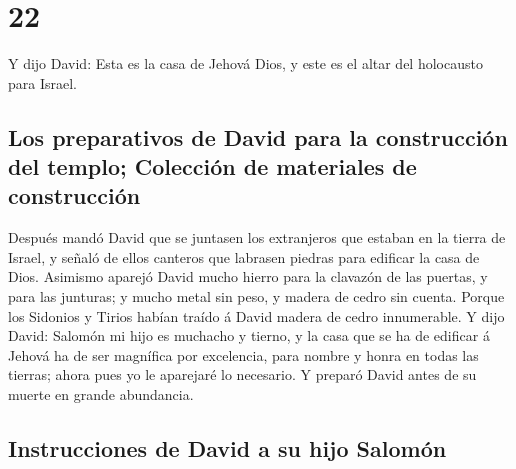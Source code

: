 \hypertarget{section-21}{%
\section{22}\label{section-21}}

 Y dijo David: Esta es la casa de Jehová Dios, y este es el
altar del holocausto para Israel.

\hypertarget{los-preparativos-de-david-para-la-construcciuxf3n-del-templo-colecciuxf3n-de-materiales-de-construcciuxf3n}{%
\subsection{Los preparativos de David para la construcción del templo;
Colección de materiales de
construcción}\label{los-preparativos-de-david-para-la-construcciuxf3n-del-templo-colecciuxf3n-de-materiales-de-construcciuxf3n}}

 Después mandó David que se juntasen los extranjeros que
estaban en la tierra de Israel, y señaló de ellos canteros que labrasen
piedras para edificar la casa de Dios.  Asimismo aparejó
David mucho hierro para la clavazón de las puertas, y para las junturas;
y mucho metal sin peso, y madera de cedro sin cuenta. 
Porque los Sidonios y Tirios habían traído á David madera de cedro
innumerable.  Y dijo David: Salomón mi hijo es muchacho y
tierno, y la casa que se ha de edificar á Jehová ha de ser magnífica por
excelencia, para nombre y honra en todas las tierras; ahora pues yo le
aparejaré lo necesario. Y preparó David antes de su muerte en grande
abundancia.

\hypertarget{instrucciones-de-david-a-su-hijo-salomuxf3n}{%
\subsection{Instrucciones de David a su hijo
Salomón}\label{instrucciones-de-david-a-su-hijo-salomuxf3n}}

